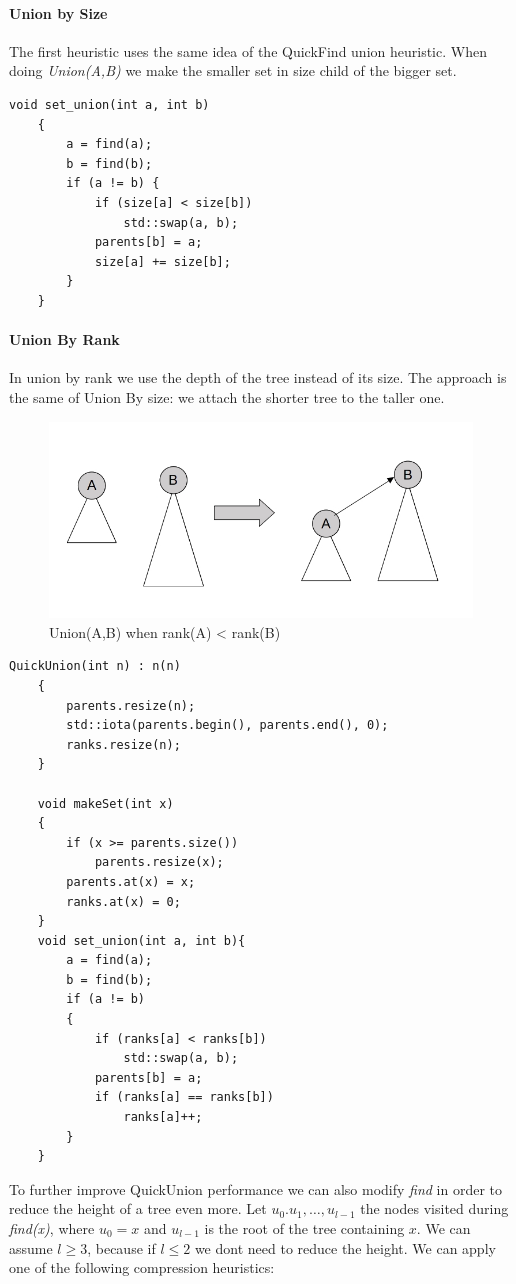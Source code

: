 \documentclass{article}
\begin{document}
\paragraph{Union by Size}
The first heuristic uses the same idea of the QuickFind union heuristic. When doing \emph{Union(A,B)}
we make the smaller set in size child of the bigger set.
\begin{lstlisting}[caption=Union by size implementation, label=quu]
    void set_union(int a, int b)
    {
        a = find(a);
        b = find(b);
        if (a != b) {
            if (size[a] < size[b])
                std::swap(a, b);
            parents[b] = a;
            size[a] += size[b];
        }
    }

\end{lstlisting}
\paragraph{Union By Rank} In union by rank we use the depth of the tree instead
of its size. The approach is the same of Union By size: we attach the shorter tree
to the taller one.
\begin{figure}[h!]
    \includegraphics[width=0.9\linewidth]{img/urank.png}
    \caption{Union(A,B) when rank(A) < rank(B)}
    \label{fig:urank}
\end{figure}
\begin{lstlisting}[caption=QuickUnion using Union by Rank]
    QuickUnion(int n) : n(n)
    {
        parents.resize(n);
        std::iota(parents.begin(), parents.end(), 0);
        ranks.resize(n);
    }

    void makeSet(int x)
    {
        if (x >= parents.size())
            parents.resize(x);
        parents.at(x) = x;
        ranks.at(x) = 0;
    }
    void set_union(int a, int b){
        a = find(a);
        b = find(b);
        if (a != b)
        {
            if (ranks[a] < ranks[b])
                std::swap(a, b);
            parents[b] = a;
            if (ranks[a] == ranks[b])
                ranks[a]++;
        }
    }
\end{lstlisting}
To further improve QuickUnion performance we can also modify \emph{find} in order to reduce the height of a tree
even more. Let $u_0. u_1, \dots, u_{l-1}$ the nodes visited during \emph{find(x)}, where $u_0 = x$ and $u_{l-1}$ is
the root of the tree containing $x$. We can assume $l \geq 3$, because if $l\leq 2$ we dont need to reduce the height.
We can apply one of the following compression heuristics:
\end{document}
